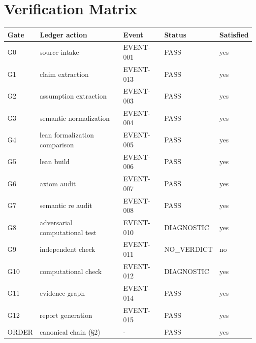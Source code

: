 \documentclass[11pt]{article}
\begin{document}
\section{Verification Matrix}
\begin{longtable}{lllll}
\toprule Gate & Ledger action & Event & Status & Satisfied \\ \midrule \endhead
G0 & source intake & EVENT-001 & PASS & yes \\
G1 & claim extraction & EVENT-013 & PASS & yes \\
G2 & assumption extraction & EVENT-003 & PASS & yes \\
G3 & semantic normalization & EVENT-004 & PASS & yes \\
G4 & lean formalization comparison & EVENT-005 & PASS & yes \\
G5 & lean build & EVENT-006 & PASS & yes \\
G6 & axiom audit & EVENT-007 & PASS & yes \\
G7 & semantic re audit & EVENT-008 & PASS & yes \\
G8 & adversarial computational test & EVENT-010 & DIAGNOSTIC & yes \\
G9 & independent check & EVENT-011 & NO\_VERDICT & no \\
G10 & computational check & EVENT-012 & DIAGNOSTIC & yes \\
G11 & evidence graph & EVENT-014 & PASS & yes \\
G12 & report generation & EVENT-015 & PASS & yes \\
ORDER & canonical chain (\S{}2) & - & PASS & yes \\
\bottomrule
\end{longtable}
\end{document}
